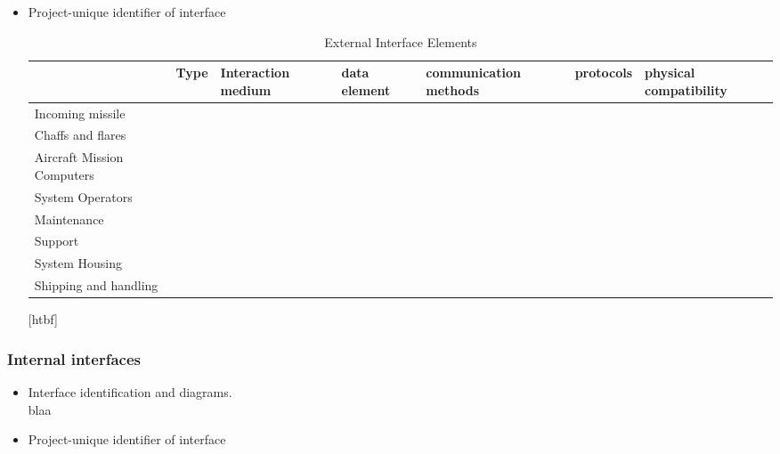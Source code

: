 \begin{itemize}
\item {Project-unique identifier of interface}\\
\begin{table}
\begin{tabular}{ l l l l l l l }
\hline
&Type&Interaction medium&data element&communication methods&protocols&physical compatibility\\
\hline
Incoming missile&&&&&&\\
\hline
Chaffs and flares&&&&&&\\
\hline
Aircraft Mission Computers&&&&&&\\
\hline
System Operators&&&&&&\\
\hline
Maintenance&&&&&&\\
\hline
Support&&&&&&\\
\hline
System Housing&&&&&&\\
\hline
Shipping and handling&&&&&&\\
\hline
\end{tabular}
\caption{External Interface Elements}
\end{table}[htbf]
\end{itemize}


\subsubsection{Internal interfaces}
\begin{itemize}
\item{Interface identification and diagrams.}\\
blaa
\item{Project-unique identifier of interface}\\

\end{itemize}
